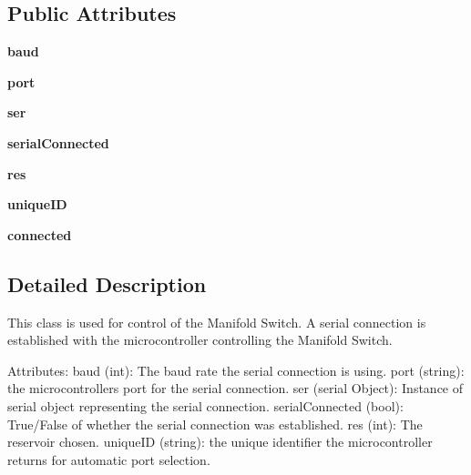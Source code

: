 \subsection*{Public Attributes}
\begin{DoxyCompactItemize}
\item 
\mbox{\label{class_mswitch_1_1_m_switch_a3b1ad086eaa3a9a2bae7ad859b002e89}} 
{\bfseries baud}
\item 
\mbox{\label{class_mswitch_1_1_m_switch_abd91d2bc2bc947ce10e54949b84abe0e}} 
{\bfseries port}
\item 
\mbox{\label{class_mswitch_1_1_m_switch_a936eb8588d8a9b8d5f5219867b5ca952}} 
{\bfseries ser}
\item 
\mbox{\label{class_mswitch_1_1_m_switch_a1dedffaf31ad772486347a9ceca3ccf2}} 
{\bfseries serial\+Connected}
\item 
\mbox{\label{class_mswitch_1_1_m_switch_a2e2a57856e19dcaf023a0e83a1fda604}} 
{\bfseries res}
\item 
\mbox{\label{class_mswitch_1_1_m_switch_ada61613dc2da7e94b2f0464a7479603e}} 
{\bfseries unique\+ID}
\item 
\mbox{\label{class_mswitch_1_1_m_switch_ae6a23408cddf05b083bd28601aa49abf}} 
{\bfseries connected}
\end{DoxyCompactItemize}


\subsection{Detailed Description}
\begin{DoxyVerb}This class is used for control of the Manifold Switch. A serial connection is established with the microcontroller controlling the Manifold Switch.

Attributes:
    baud (int): The baud rate the serial connection is using.
    port (string): the microcontrollers port for the serial connection.
    ser (serial Object): Instance of serial object representing the serial connection.
    serialConnected (bool): True/False of whether the serial connection was established.
    res (int): The reservoir chosen.
    uniqueID (string): the unique identifier the microcontroller returns for automatic port selection.\end{DoxyVerb}
 


